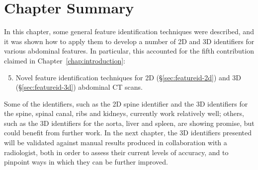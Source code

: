\afterpage{\clearpage}
\newpage

\section{Chapter Summary}

In this chapter, some general feature identification techniques were described, and it was shown how to apply them to develop a number of 2D and 3D identifiers for various abdominal features. In particular, this accounted for the fifth contribution claimed in Chapter~\ref{chap:introduction}:
%
\begin{enumerate}
\setcounter{enumi}{4}
\item Novel feature identification techniques for 2D (\S\ref{sec:featureid-2d}) and 3D (\S\ref{sec:featureid-3d}) abdominal CT scans.
\end{enumerate}
%
Some of the identifiers, such as the 2D spine identifier and the 3D identifiers for the spine, spinal canal, ribs and kidneys, currently work relatively well; others, such as the 3D identifiers for the aorta, liver and spleen, are showing promise, but could benefit from further work. In the next chapter, the 3D identifiers presented will be validated against manual results produced in collaboration with a radiologist, both in order to assess their current levels of accuracy, and to pinpoint ways in which they can be further improved.
